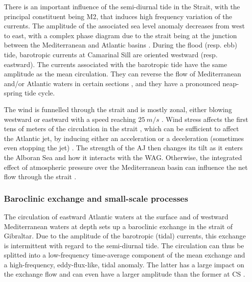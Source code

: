 \color{red}There is an important influence of the semi-diurnal tide in the Strait, with the principal constituent being M2, that induces high frequency variation of the currents. The amplitude of the associated sea level anomaly decreases from west to east, with a complex phase diagram due to the strait being at the junction between the Mediterranean and Atlantic basins \citep{garcialafuente_1990,CW90}.\color{black} During the flood (resp. ebb) tide, barotropic currents \color{red}at Camarinal Sill \color{black} are oriented westward (resp. eastward). The currents associated with the barotropic tide have the same amplitude as the mean circulation. They can reverse the flow of Mediterranean and/or Atlantic waters in certain sections \citep{sanchez-roman_2012}, and they have a pronounced neap-spring tide cycle.

The wind is funnelled through the strait and is mostly zonal, either blowing westward or eastward with a speed reaching $25\ m/s$ \citep{candela_1989}. Wind stress affects the first tens of meters of the circulation in the strait \citep{candela_1989}, which can be sufficient to affect the Atlantic jet, by inducing either an acceleration or a deceleration (sometimes even stopping the jet) \citep{garcialafuente_2002c}. The strength of the AJ then changes its tilt as it enters the Alboran Sea and how it interacts with the WAG. Otherwise, the integrated effect of atmospheric pressure over the Mediterranean basin can influence the net flow through the strait \citep{garcialafuente_2002}.

\subsubsection{Baroclinic exchange and small-scale processes}

The circulation of eastward Atlantic waters at the surface and of westward Mediterranean waters at depth sets up a baroclinic exchange in the strait of Gibraltar. Due to the amplitude of the barotropic (tidal) currents, this exchange is intermittent with regard to the semi-diurnal tide. The circulation can thus be splitted into a low-frequency time-average component of the mean exchange and a high-frequency, eddy-flux-like, tidal anomaly. The latter has a large impact on the exchange flow \citep{Naranjo2014} and can even have a larger amplitude than the former at CS \citep{vargas_2006}.

